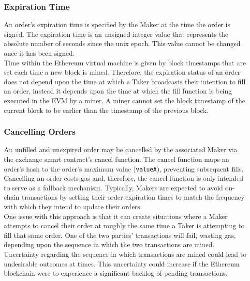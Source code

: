 \documentclass[10pt]{article}
\begin{document}
\pagebreak

\subsubsection{Expiration Time}

An order's expiration time is specified by the Maker at the time the order is signed. The expiration time is an unsigned integer value that represents the absolute number of seconds since the unix epoch. This value cannot be changed once it has been signed. \\

\noindent Time within the Ethereum virtual machine is given by block timestamps that are set each time a new block is mined. Therefore, the expiration status of an order does not depend upon the time at which a Taker broadcasts their intention to fill an order, instead it depends upon the time at which the fill function is being executed in the EVM by a miner. A miner cannot set the block timestamp of the current block to be earlier than the timestamp of the previous block.

\subsubsection{Cancelling Orders}

An unfilled and unexpired order may be cancelled by the associated Maker via the exchange smart contract's cancel function. The cancel function maps an order's hash to the order's maximum value (\texttt{valueA}), preventing subsequent fills. Cancelling an order costs gas and, therefore, the cancel function is only intended to serve as a fallback mechanism. Typically, Makers are expected to avoid on-chain transactions by setting their order expiration times to match the frequency with which they intend to update their orders. \\

\noindent One issue with this approach is that it can create situations where a Maker attempts to cancel their order at roughly the same time a Taker is attempting to fill that same order. One of the two parties’ transactions will fail, wasting gas, depending upon the sequence in which the two transactions are mined. Uncertainty regarding the sequence in which transactions are mined could lead to undesirable outcomes at times. This uncertainty could increase if the Ethereum blockchain were to experience a significant backlog of pending transactions.

\pagebreak
\end{document}
